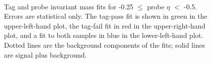 \documentclass[dissertation.tex]{subfiles}
\begin{document}
\begin{figure}
	\centering
	\\
	\caption{Tag and probe invariant mass fits for -0.25 $\leq$ probe $\eta$ $<$ -0.5.  Errors are statistical only.  The tag-pass fit is shown in green in the upper-left-hand plot, the tag-fail fit in red in the upper-right-hand plot, and a fit to both samples in blue in the lower-left-hand plot.  Dotted lines are the background components of the fits; solid lines are signal plus background.}
	\label{fig:mid-eta_bin}
\end{figure}
\end{document}
